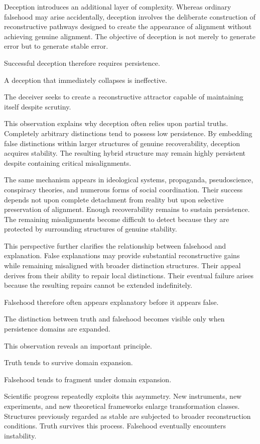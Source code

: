 \documentclass[12pt,oneside]{article}
\theoremstyle{definition}
\begin{document}
Deception introduces an additional layer of complexity. Whereas ordinary falsehood may arise accidentally, deception involves the deliberate construction of reconstructive pathways designed to create the appearance of alignment without achieving genuine alignment. The objective of deception is not merely to generate error but to generate stable error.

Successful deception therefore requires persistence.

A deception that immediately collapses is ineffective.

The deceiver seeks to create a reconstructive attractor capable of maintaining itself despite scrutiny.

This observation explains why deception often relies upon partial truths. Completely arbitrary distinctions tend to possess low persistence. By embedding false distinctions within larger structures of genuine recoverability, deception acquires stability. The resulting hybrid structure may remain highly persistent despite containing critical misalignments.

The same mechanism appears in ideological systems, propaganda, pseudoscience, conspiracy theories, and numerous forms of social coordination. Their success depends not upon complete detachment from reality but upon selective preservation of alignment. Enough recoverability remains to sustain persistence. The remaining misalignments become difficult to detect because they are protected by surrounding structures of genuine stability.

This perspective further clarifies the relationship between falsehood and explanation. False explanations may provide substantial reconstructive gains while remaining misaligned with broader distinction structures. Their appeal derives from their ability to repair local distinctions. Their eventual failure arises because the resulting repairs cannot be extended indefinitely.

Falsehood therefore often appears explanatory before it appears false.

The distinction between truth and falsehood becomes visible only when persistence domains are expanded.

This observation reveals an important principle.

Truth tends to survive domain expansion.

Falsehood tends to fragment under domain expansion.

Scientific progress repeatedly exploits this asymmetry. New instruments, new experiments, and new theoretical frameworks enlarge transformation classes. Structures previously regarded as stable are subjected to broader reconstruction conditions. Truth survives this process. Falsehood eventually encounters instability.
\end{document}
